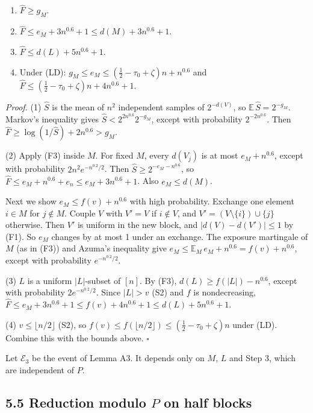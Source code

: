 \documentclass[10pt,a4paper]{article}
\begin{document}
\begin{enumerate}
\item $\hat F \ge g_M$.
\item $\hat F \le e_M + 3n^{0.6} + 1 \le d(M) + 3n^{0.6} + 1$.
\item $\hat F \le d(L) + 5n^{0.6} + 1$.
\item Under (LD): $g_M \le e_M \le (\tfrac12 - \tau_0 + \zeta)n + n^{0.6}$ and $\hat F \le (\tfrac12 - \tau_0 + \zeta)n + 4n^{0.6} + 1$.
\end{enumerate}

\emph{Proof.} (1) $\hat S$ is the mean of $n^2$ independent samples of $2^{-d(V)}$, so $\mathbb E\,\hat S = 2^{-g_M}$. Markov's
inequality gives $\hat S < 2^{2n^{0.6}}2^{-g_M}$, except with probability $2^{-2n^{0.6}}$. Then
$\hat F \ge \log(1/\hat S) + 2n^{0.6} > g_M$.

(2) Apply (F3) inside $M$. For fixed $M$, every $d(V_j)$ is at most $e_M + n^{0.6}$, except with probability
$2n^2e^{-n^{0.2}/2}$. Then $\hat S \ge 2^{-e_M - n^{0.6}}$, so $\hat F \le e_M + n^{0.6} + e_n \le e_M + 3n^{0.6} + 1$.
Also $e_M \le d(M)$.

Next we show $e_M \le f(v) + n^{0.6}$ with high probability. Exchange one element $i \in M$ for $j \notin M$. Couple $V$
with $V' = V$ if $i \notin V$, and $V' = (V\setminus\{i\})\cup\{j\}$ otherwise. Then $V'$ is uniform in the new block, and
$|d(V) - d(V')| \le 1$ by (F1). So $e_M$ changes by at most 1 under an exchange. The exposure martingale of $M$ (as in
(F3)) and Azuma's inequality give $e_M \le \mathbb E_M\, e_M + n^{0.6} = f(v) + n^{0.6}$, except with probability
$e^{-n^{0.2}/2}$.

(3) $L$ is a uniform $|L|$-subset of $[n]$. By (F3), $d(L) \ge f(|L|) - n^{0.6}$, except with probability
$2e^{-n^{0.2}/2}$. Since $|L| > v$ (S2) and $f$ is nondecreasing,
$\hat F \le e_M + 3n^{0.6} + 1 \le f(v) + 4n^{0.6} + 1 \le d(L) + 5n^{0.6} + 1$.

(4) $v \le \lfloor n/2\rfloor$ (S2), so $f(v) \le f(\lfloor n/2\rfloor) \le (\tfrac12 - \tau_0 + \zeta)n$ under (LD).
Combine this with the bounds above. $\square$

Let $\mathcal E_3$ be the event of Lemma A3. It depends only on $M$, $L$ and Step 3, which are independent of $P$.

\subsection*{5.5 Reduction modulo $P$ on half blocks}
\end{document}
